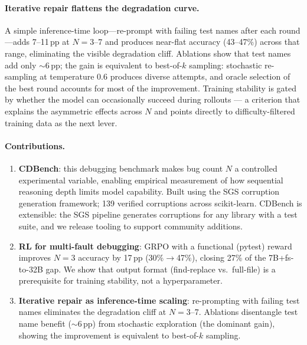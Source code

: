 \documentclass[12pt]{article}
\begin{document}
\paragraph{Iterative repair flattens the degradation curve.}
A simple inference-time loop---re-prompt with failing test names after each
round---adds 7--11\,pp at $N{=}3$--7 and produces near-flat accuracy (43--47\%)
across that range, eliminating the visible degradation cliff. Ablations show
that test names add only ${\sim}6$\,pp; the gain is equivalent to best-of-$k$ sampling: stochastic re-sampling at temperature 0.6 produces diverse attempts, and oracle selection of the best round accounts for most of the improvement. Training stability is gated by whether the model can occasionally succeed during rollouts — a criterion that explains the asymmetric effects across $N$ and points directly to difficulty-filtered training data as the next lever.


\paragraph{Contributions.}
\begin{enumerate}[topsep=2pt,itemsep=1pt]
  \item \textbf{CDBench}: this debugging benchmark makes bug count $N$ a
  controlled experimental variable, enabling empirical measurement of how
  sequential reasoning depth limits model capability. Built using the SGS
  corruption generation framework; 139 verified corruptions across scikit-learn. 
  CDBench is extensible: the SGS pipeline generates corruptions for any library
  with a test suite, and we release tooling to support community additions.

  \item \textbf{RL for multi-fault debugging}: GRPO with a functional (pytest)
  reward improves $N{=}3$ accuracy by 17\,pp (30\%$\to$47\%), closing 27\% of
  the 7B+fs-to-32B gap. We show that output format (find-replace vs.\ full-file)
  is a prerequisite for training stability, not a hyperparameter.

  \item \textbf{Iterative repair as inference-time scaling}: re-prompting with
  failing test names eliminates the degradation cliff at $N{=}3$--7. Ablations
  disentangle test name benefit (${\sim}6$\,pp) from stochastic exploration
  (the dominant gain), showing the improvement is equivalent to best-of-$k$
  sampling.
\end{enumerate}
\end{document}
